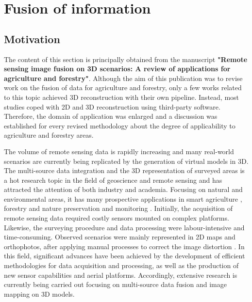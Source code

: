 \section{Fusion of information}

\subsection{Motivation}

The content of this section is principally obtained from the manuscript \textbf{"Remote sensing image fusion on 3D scenarios: A review of applications for agriculture and forestry"}. Although the aim of this publication was to revise work on the fusion of data for agriculture and forestry, only a few works related to this topic achieved 3D reconstruction with their own pipeline. Instead, most studies coped with 2D and 3D reconstruction using third-party software. Therefore, the domain of application was enlarged and a discussion was established for every revised methodology about the degree of applicability to agriculture and forestry areas.

The volume of remote sensing data is rapidly increasing and many real-world scenarios are currently being replicated by the generation of virtual models in 3D. The multi-source data integration and the 3D representation of surveyed areas is a hot research topic in the field of geoscience and remote sensing and has attracted the attention of both industry and academia. Focusing on natural and environmental areas, it has many prospective applications in smart agriculture \cite{jurado_multispectral_2020, padua_vineyard_2019, poblete_discriminating_2021}, forestry and nature preservation \cite{almeida_monitoring_2021, guimaraes_forestry_2020, heckel_predicting_2020, schiefer_mapping_2020} and monitoring \cite{maimaitijiang_crop_2020}. Initially, the acquisition of remote sensing data required costly sensors mounted on complex platforms. Likewise, the surveying procedure and data processing were labour-intensive and time-consuming. Observed scenarios were mainly represented in 2D maps and orthophotos, after applying manual processes to correct the image distortion \cite{vong_how_2021}. In this field, significant advances have been achieved by the development of efficient methodologies for data acquisition and processing, as well as the production of new sensor capabilities and aerial platforms. Accordingly, extensive research is currently being carried out focusing on multi-source data fusion and image mapping on 3D models.

